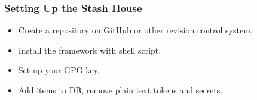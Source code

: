\begin{frame}
	\frametitle{Setting Up the Stash House}
	\begin{itemize}
		\item Create a repository on GitHub or other revision control system.
		\item Install the framework with shell script.
		\item Set up your GPG key.
		\item Add items to DB, remove plain text tokens and secrets.
	\end{itemize}
\end{frame}
